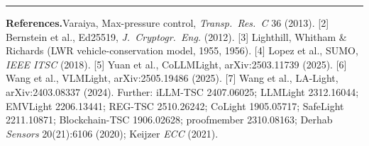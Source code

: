 \documentclass[11pt]{article}
\begin{document}
\vspace{4pt}
{\color{nbblue!40}\hrule}
\vspace{2pt}
{\scriptsize\color{nbgrey}
\textbf{References.}\enspace
[1] Varaiya, Max-pressure control, \emph{Transp.\ Res.\ C} 36 (2013).
[2] Bernstein et al., Ed25519, \emph{J.\ Cryptogr.\ Eng.} (2012).
[3] Lighthill, Whitham \& Richards (LWR vehicle-conservation model, 1955, 1956).
[4] Lopez et al., SUMO, \emph{IEEE ITSC} (2018).
[5] Yuan et al., CoLLMLight, arXiv:2503.11739 (2025).
[6] Wang et al., VLMLight, arXiv:2505.19486 (2025).
[7] Wang et al., LA-Light, arXiv:2403.08337 (2024). Further: iLLM-TSC 2407.06025; LLMLight 2312.16044; EMVLight 2206.13441; REG-TSC 2510.26242; CoLight 1905.05717; SafeLight 2211.10871; Blockchain-TSC 1906.02628; proofmember 2310.08163; Derhab \emph{Sensors} 20(21):6106 (2020); Keijzer \emph{ECC} (2021).
}
\end{document}
